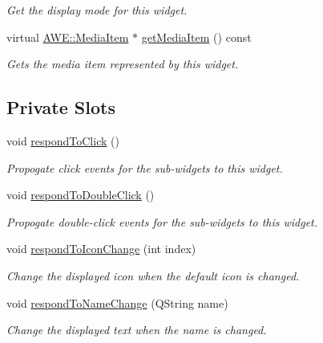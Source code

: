 \begin{DoxyCompactItemize}
\begin{DoxyCompactList}\small\item\em Get the display mode for this widget. \end{DoxyCompactList}\item 
virtual \hyperlink{class_a_w_e_1_1_media_item}{A\-W\-E\-::\-Media\-Item} $\ast$ \hyperlink{class_u_i_1_1_media_item_widget_a2c46035bc9e8733507be9926167e9288}{get\-Media\-Item} () const 
\begin{DoxyCompactList}\small\item\em Gets the media item represented by this widget. \end{DoxyCompactList}\end{DoxyCompactItemize}
\subsection*{Private Slots}
\begin{DoxyCompactItemize}
\item 
\hypertarget{class_u_i_1_1_media_item_widget_ad3ebd1ac00101b64c1bd191805bffcc9}{void \hyperlink{class_u_i_1_1_media_item_widget_ad3ebd1ac00101b64c1bd191805bffcc9}{respond\-To\-Click} ()}\label{class_u_i_1_1_media_item_widget_ad3ebd1ac00101b64c1bd191805bffcc9}

\begin{DoxyCompactList}\small\item\em Propogate click events for the sub-\/widgets to this widget. \end{DoxyCompactList}\item 
\hypertarget{class_u_i_1_1_media_item_widget_a5da3c15bef064b501368da315bb501b6}{void \hyperlink{class_u_i_1_1_media_item_widget_a5da3c15bef064b501368da315bb501b6}{respond\-To\-Double\-Click} ()}\label{class_u_i_1_1_media_item_widget_a5da3c15bef064b501368da315bb501b6}

\begin{DoxyCompactList}\small\item\em Propogate double-\/click events for the sub-\/widgets to this widget. \end{DoxyCompactList}\item 
void \hyperlink{class_u_i_1_1_media_item_widget_ada5b4fb905bbf7f1f2665afe58629f7f}{respond\-To\-Icon\-Change} (int index)
\begin{DoxyCompactList}\small\item\em Change the displayed icon when the default icon is changed. \end{DoxyCompactList}\item 
void \hyperlink{class_u_i_1_1_media_item_widget_a6c6ab3acf5b48d45c2f17a9899afabfe}{respond\-To\-Name\-Change} (Q\-String name)
\begin{DoxyCompactList}\small\item\em Change the displayed text when the name is changed. \end{DoxyCompactList}\end{DoxyCompactItemize}
